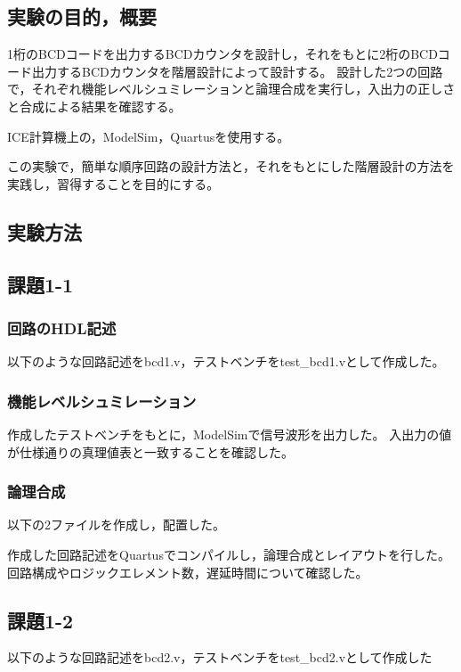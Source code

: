 
\subsection{実験の目的，概要}
1桁のBCDコードを出力するBCDカウンタを設計し，それをもとに2桁のBCDコード出力するBCDカウンタを階層設計によって設計する。
設計した2つの回路で，それぞれ機能レベルシュミレーションと論理合成を実行し，入出力の正しさと合成による結果を確認する。

ICE計算機上の，ModelSim，Quartusを使用する。

この実験で，簡単な順序回路の設計方法と，それをもとにした階層設計の方法を実践し，習得することを目的にする。

\subsection{実験方法}
\subsection*{課題1-1}
\subsubsection{回路のHDL記述}
以下のような回路記述をbcd1.v，テストベンチをtest\_bcd1.vとして作成した。



\subsubsection{機能レベルシュミレーション}
作成したテストベンチをもとに，ModelSimで信号波形を出力した。
入出力の値が仕様通りの真理値表と一致することを確認した。

\subsubsection{論理合成}
以下の2ファイルを作成し，配置した。



作成した回路記述をQuartusでコンパイルし，論理合成とレイアウトを行した。
回路構成やロジックエレメント数，遅延時間について確認した。

\subsection*{課題1-2}
以下のような回路記述をbcd2.v，テストベンチをtest\_bcd2.vとして作成した



